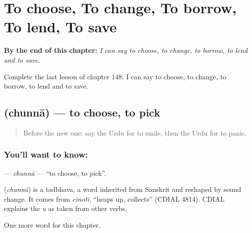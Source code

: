 
\chapter{To choose, To change, To borrow, To lend, To save}
\label{ch:ur-to-choose-to-change-to-borrow-to-lend-to-save}

\begin{chapteropening}
\textbf{By the end of this chapter:} \emph{I can say to choose, to change, to borrow, to lend and to save.}

Complete the last lesson of chapter 148: I can say to choose, to change, to borrow, to lend and to save.
\end{chapteropening}

\section[\texorpdfstring{\ur{چننا} (chunnā)}{چننا (chunnā)}]{ (chunnā) — to choose, to pick}

\label{lesson:UR-C148-chunna}



\begin{quote}
Before the new one: say the Urdu for to smile, then the Urdu for to panic.
\end{quote}

\subsection*{You'll want to know: }
\textbf{} — \emph{chunnā} — \textquotedblleft{}to choose, to pick\textquotedblright{}.

\begin{cousinweb}
\textbf{} (\emph{chunnā}) is a tadbhava, a word inherited from Sanskrit and reshaped by sound change. It comes from \emph{cinoti}, \textquotedblleft{}heaps up, collects\textquotedblright{} (CDIAL 4814). CDIAL explains the \emph{u} as taken from other verbs.
\end{cousinweb}

\begin{grammarlens}[title={What you've built}]
One more word for this chapter.
\end{grammarlens}

